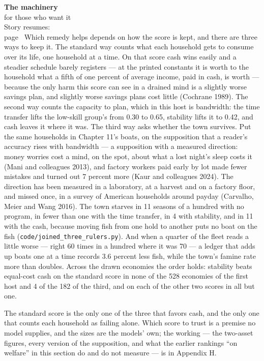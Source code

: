 \begin{machinery}{\textbf{The machinery}\\for those who want it\\[3pt]{\color{muted}Story resumes:\\page~\pageref{ch15}}}
\noindent Which remedy helps depends on how the score is kept, and there are
three ways to keep it. The standard way counts what each household
gets to consume over its life, one household at a time. On that score
cash wins easily and a steadier schedule barely registers --- at the
printed constants it is worth to the household what a fifth of one
percent of average income, paid in cash, is worth --- because the only
harm this score can see in a drained mind is a slightly worse savings
plan, and slightly worse savings plans cost little (Cochrane 1989).
The second way counts the capacity to plan, which in this host is
bandwidth: the time transfer lifts the low-skill group's from 0.30 to
0.65, stability lifts it to 0.42, and cash leaves it where it was. The
third way asks whether the town survives. Put the same households in
Chapter 11's boats, on the supposition that a reader's accuracy rises
with bandwidth --- a supposition with a measured direction: money
worries cost a mind, on the spot, about what a lost night's sleep
costs it (Mani and colleagues 2013), and factory workers paid early by
lot made fewer mistakes and turned out 7 percent more (Kaur and
colleagues 2024). The direction has been measured in a laboratory, at
a harvest and on a factory floor, and missed once, in a survey of
American households around payday (Carvalho, Meier and Wang 2016). The town starves in 11 seasons
of a hundred with no program, in fewer than one with the time
transfer, in 4 with stability, and in 11 with the cash, because moving
fish from one hold to another puts no boat on the fish
(\texttt{code/\allowbreak{}joined\_\allowbreak{}three\_\allowbreak{}rulers.\allowbreak{}py}). And when a quarter of the fleet reads
a little worse --- right 60 times in a hundred where it was 70 --- a
ledger that adds up boats one at a time records 3.6 percent less fish,
while the town's famine rate more than doubles. Across the drawn
economies the order holds: stability beats equal-cost cash on the
standard score in none of the 528 economies of the first host and 4 of
the 182 of the third, and on each of the other two scores in all but
one.

The standard score is the only one of the three that favors cash, and
the only one that counts each household as failing alone. Which score
to trust is a premise no model supplies, and the sizes are the models'
own; the working --- the two-asset figures, every version of the
supposition, and what the earlier rankings ``on welfare'' in this
section do and do not measure --- is in Appendix H.


\end{machinery}
